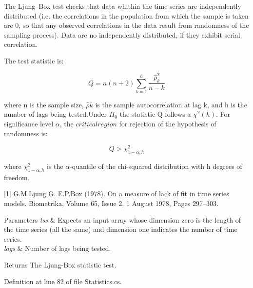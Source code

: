 The Ljung–\+Box test checks that data whithin the time series are independently distributed (i.\+e. the correlations in the population from which the sample is taken are 0, so that any observed correlations in the data result from randomness of the sampling process). Data are no independently distributed, if they exhibit serial correlation. 

The test statistic is\+:

\[ Q = n\left(n + 2\right)\sum_{ k = 1}^h\frac{\hat{\rho}^2_k}{n-k} \]

where \textquotesingle{}\textquotesingle{}n\textquotesingle{}\textquotesingle{} is the sample size, $\hat{\rho}k $ is the sample autocorrelation at lag \textquotesingle{}\textquotesingle{}k\textquotesingle{}\textquotesingle{}, and \textquotesingle{}\textquotesingle{}h\textquotesingle{}\textquotesingle{} is the number of lags being tested.\+Under $ H_0 $ the statistic Q follows a $\chi^2{ (h)} $. For significance level $\alpha$, the $critical region$ for rejection of the hypothesis of randomness is\+:

\[ Q > \chi_{1-\alpha,h}^2 \]

where $ \chi_{1-\alpha,h}^2 $ is the $\alpha$-\/quantile of the chi-\/squared distribution with \textquotesingle{}\textquotesingle{}h\textquotesingle{}\textquotesingle{} degrees of freedom.

\mbox{[}1\mbox{]} G.\+M.\+Ljung G. E.\+P.\+Box (1978). On a measure of lack of fit in time series models. Biometrika, Volume 65, Issue 2, 1 August 1978, Pages 297–303. 


\begin{DoxyParams}{Parameters}
{\em tss} & Expects an input array whose dimension zero is the length of the time series (all the same) and dimension one indicates the number of time series.\\
\hline
{\em lags} & Number of lags being tested.\\
\hline
\end{DoxyParams}
\begin{DoxyReturn}{Returns}
The Ljung-\/\+Box statistic test.
\end{DoxyReturn}


Definition at line 82 of file Statistics.\+cs.

\mbox{\label{classkhiva_1_1statistics_1_1_statistics_a86385983836f53b52640f11dcd4d78b6}} 
